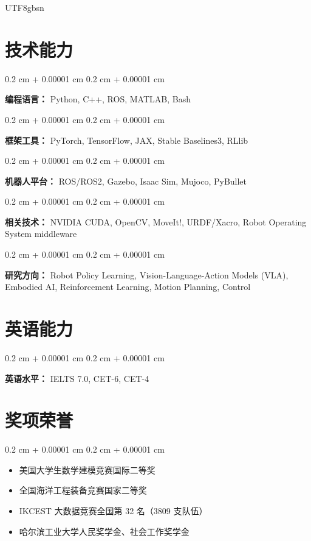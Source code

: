 \documentclass[10pt, letterpaper]{article}
\newenvironment{highlights}{
    \begin{itemize}[
        topsep=0.10 cm,
        parsep=0.10 cm,
        partopsep=0pt,
        itemsep=0pt,
        leftmargin=0.4 cm + 10pt
    ]
}{
    \end{itemize}
} %
\newenvironment{onecolentry}{
    \begin{adjustwidth}{
        0.2 cm + 0.00001 cm
    }{
        0.2 cm + 0.00001 cm
    }
}{
    \end{adjustwidth}
} %
\begin{document}
\begin{CJK*}{UTF8}{gbsn}
\section{技术能力}

\begin{onecolentry}
    \textbf{编程语言：} Python, C++, ROS, MATLAB, Bash
\end{onecolentry}

\vspace{0.2 cm}

\begin{onecolentry}
    \textbf{框架工具：} PyTorch, TensorFlow, JAX, Stable Baselines3, RLlib
\end{onecolentry}

\vspace{0.2 cm}

\begin{onecolentry}
    \textbf{机器人平台：} ROS/ROS2, Gazebo, Isaac Sim, Mujoco, PyBullet
\end{onecolentry}

\vspace{0.2 cm}

\begin{onecolentry}
    \textbf{相关技术：} NVIDIA CUDA, OpenCV, MoveIt!, URDF/Xacro, Robot Operating System middleware
\end{onecolentry}

\vspace{0.2 cm}

\begin{onecolentry}
    \textbf{研究方向：} Robot Policy Learning, Vision-Language-Action Models (VLA), Embodied AI, Reinforcement Learning, Motion Planning, Control
\end{onecolentry}

\section{英语能力}

\begin{onecolentry}
    \textbf{英语水平：} IELTS 7.0, CET-6, CET-4
\end{onecolentry}

\section{奖项荣誉}

\begin{onecolentry}
    \begin{highlights}
        \item 美国大学生数学建模竞赛国际二等奖
        \item 全国海洋工程装备竞赛国家二等奖
        \item IKCEST 大数据竞赛全国第 32 名（3809 支队伍）
        \item 哈尔滨工业大学人民奖学金、社会工作奖学金
    \end{highlights}
\end{onecolentry}


\end{CJK*}
\end{document}
